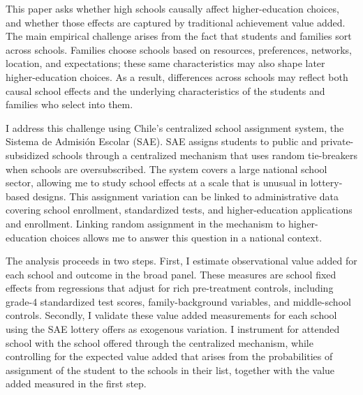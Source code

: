 \documentclass[a4paper, article, english, oneside, unknownkeysallowed, 12pt]{memoir}
\begin{document}
This paper asks whether high schools causally affect higher-education choices, and whether those effects are captured by traditional achievement value added.
The main empirical challenge arises from the fact that students and families sort across schools.
Families choose schools based on resources, preferences, networks, location, and expectations; these same characteristics may also shape later higher-education choices.
As a result, differences across schools may reflect both causal school effects and the underlying characteristics of the students and families who select into them.

I address this challenge using Chile's centralized school assignment system, the Sistema de Admisi\'on Escolar (SAE).
SAE assigns students to public and private-subsidized schools through a centralized mechanism that uses random tie-breakers when schools are oversubscribed.
The system covers a large national school sector, allowing me to study school effects at a scale that is unusual in lottery-based designs.
This assignment variation can be linked to administrative data covering school enrollment, standardized tests, and higher-education applications and enrollment.
Linking random assignment in the mechanism to higher-education choices allows me to answer this question in a national context.


The analysis proceeds in two steps.
First, I estimate observational value added for each school and outcome in the broad panel.
These measures are school fixed effects from regressions that adjust for rich pre-treatment controls, including grade-4 standardized test scores, family-background variables, and middle-school controls.
Secondly, I validate these value added measurements for each school using the SAE lottery offers as exogenous variation.
I instrument for attended school with the school offered through the centralized mechanism, while controlling for the expected value added that arises from the probabilities of assignment of the student to the schools in their list, together with the value added measured in the first step.
\end{document}
